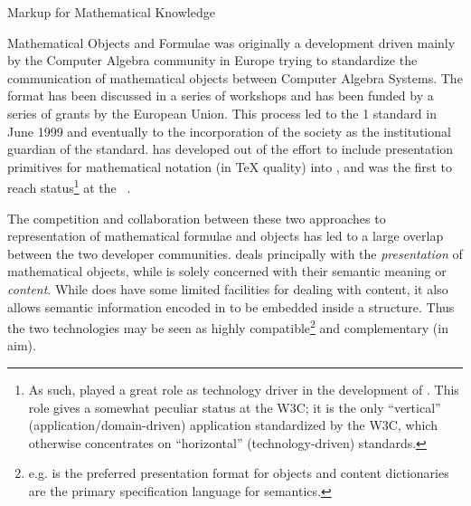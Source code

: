 \begin{omgroup}[id=math-markup]{Markup for Mathematical Knowledge}
\begin{omgroup}[id=math-objects]{Mathematical Objects and Formulae}
    {\openmath} was originally a development driven mainly by the Computer Algebra
    community in Europe trying to standardize the communication of mathematical objects
    between Computer Algebra Systems. The format has been discussed in a series of
    workshops and has been funded by a series of grants by the European Union. This
    process led to the {\openmath} 1 standard in June 1999 and eventually to the
    incorporation of the {\openmath} society as the institutional guardian of the
    {\openmath} standard. {\mathml} has developed out of the effort to include
    presentation primitives for mathematical notation (in {\TeX}{}
    quality) into {\html}, and was the first {\xml}
     to reach {}
    status\footnote{As such, {\mathml} played a great role as technology driver in the
      development of {\xml}. This role gives {\mathml} a somewhat peculiar status at the
      W3C; it is the only ``vertical'' (application/domain-driven) {\xml} application
      standardized by the W3C, which otherwise concentrates on ``horizontal''
      (technology-driven) standards.} at the {}~\cite{IonMin:MathML99}.
    
    The competition and collaboration between these two approaches to representation of
    mathematical formulae and objects has led to a large overlap between the two developer
    communities.  {\mathml} deals principally with the {\emph{presentation}} of
    mathematical objects, while {\openmath} is solely concerned with their semantic
    meaning or {\emph{content}}.  While {\mathml} does have some limited facilities for
    dealing with content, it also allows semantic information encoded in {\openmath} to be
    embedded inside a {\mathml} structure.  Thus the two technologies may be seen as
    highly compatible\footnote{e.g. {\mathml} is the preferred presentation format for
      {\openmath} objects and {\openmath} content dictionaries are the primary
      specification language for {\mathml} semantics.} and complementary (in aim).

\begin{omgroup}[id=math-markup.mathml]{\mathml}

  \begin{center}
 \end{center}


\end{omgroup}
\end{omgroup}
\end{omgroup}
